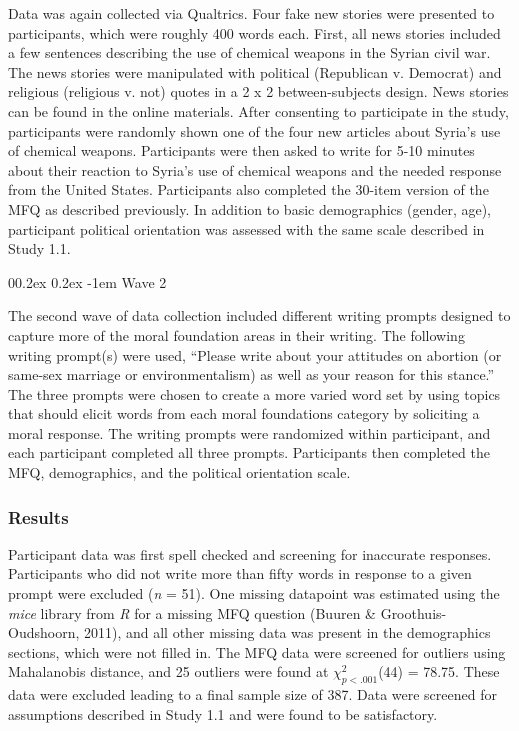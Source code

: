 \documentclass[
  man,floatsintext]{apa6}
\makeatletter
\let\oldparagraph\paragraph
\renewcommand{\paragraph}{
    \@ifstar
      \xxxParagraphStar
      \xxxParagraphNoStar
  }
\newcommand{\xxxParagraphStar}[1]{\oldparagraph*{#1}\mbox{}}
\newcommand{\xxxParagraphNoStar}[1]{\oldparagraph{#1}\mbox{}}
\renewcommand{\paragraph}{\@startsection{paragraph}{4}{\parindent}%
  {0\baselineskip \@plus 0.2ex \@minus 0.2ex}%
  {-1em}%
  {\normalfont\normalsize\bfseries\itshape\typesectitle}}
\makeatother
\begin{document}
Data was again collected via Qualtrics. Four fake new stories
were presented to participants, which were roughly 400 words each.
First, all news stories included a few sentences describing the use of
chemical weapons in the Syrian civil war. The news stories were
manipulated with political (Republican v. Democrat) and religious
(religious v. not) quotes in a 2 x 2 between-subjects design. News
stories can be found in the online materials. After consenting to
participate in the study, participants were randomly shown one of the
four new articles about Syria's use of chemical weapons. Participants
were then asked to write for 5-10 minutes about their reaction to
Syria's use of chemical weapons and the needed response from the United
States. Participants also completed the 30-item version of the MFQ as
described previously. In addition to basic demographics (gender, age),
participant political orientation was assessed with the same scale
described in Study 1.1.

\paragraph{Wave 2}\label{wave-2}

The second wave of data collection included different writing prompts
designed to capture more of the moral foundation areas in their writing.
The following writing prompt(s) were used, ``Please write about your
attitudes on abortion (or same-sex marriage or environmentalism) as well
as your reason for this stance.'' The three prompts were chosen to create
a more varied word set by using topics that should elicit words from
each moral foundations category by soliciting a moral response. The
writing prompts were randomized within participant, and each participant
completed all three prompts. Participants then completed the MFQ,
demographics, and the political orientation scale.

\subsubsection{Results}\label{results-1}

Participant data was first spell checked and screening for inaccurate
responses. Participants who did not write more than fifty words in
response to a given prompt were excluded (\emph{n} =
51). One missing datapoint was
estimated using the \emph{mice} library from \emph{R} for a missing MFQ question
(Buuren \& Groothuis-Oudshoorn, 2011), and all other missing data was present in the
demographics sections, which were not filled in. The MFQ data were
screened for outliers using Mahalanobis distance, and 25 outliers were
found at \(\chi^2_{p<.001}\)(44) =
78.75. These data were excluded leading to a final
sample size of 387. Data were screened for assumptions
described in Study 1.1 and were found to be satisfactory.
\end{document}
